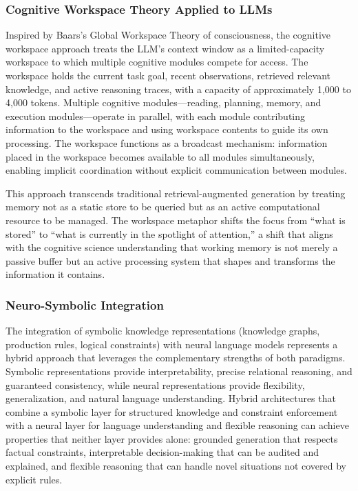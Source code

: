 \subsubsection{Cognitive Workspace Theory Applied to LLMs}

Inspired by Baars's Global Workspace Theory of consciousness, the cognitive workspace approach treats the LLM's context window as a limited-capacity workspace to which multiple cognitive modules compete for access. The workspace holds the current task goal, recent observations, retrieved relevant knowledge, and active reasoning traces, with a capacity of approximately 1,000 to 4,000 tokens. Multiple cognitive modules---reading, planning, memory, and execution modules---operate in parallel, with each module contributing information to the workspace and using workspace contents to guide its own processing. The workspace functions as a broadcast mechanism: information placed in the workspace becomes available to all modules simultaneously, enabling implicit coordination without explicit communication between modules.

This approach transcends traditional retrieval-augmented generation by treating memory not as a static store to be queried but as an active computational resource to be managed. The workspace metaphor shifts the focus from ``what is stored'' to ``what is currently in the spotlight of attention,'' a shift that aligns with the cognitive science understanding that working memory is not merely a passive buffer but an active processing system that shapes and transforms the information it contains.

\subsubsection{Neuro-Symbolic Integration}

The integration of symbolic knowledge representations (knowledge graphs, production rules, logical constraints) with neural language models represents a hybrid approach that leverages the complementary strengths of both paradigms. Symbolic representations provide interpretability, precise relational reasoning, and guaranteed consistency, while neural representations provide flexibility, generalization, and natural language understanding. Hybrid architectures that combine a symbolic layer for structured knowledge and constraint enforcement with a neural layer for language understanding and flexible reasoning can achieve properties that neither layer provides alone: grounded generation that respects factual constraints, interpretable decision-making that can be audited and explained, and flexible reasoning that can handle novel situations not covered by explicit rules.

